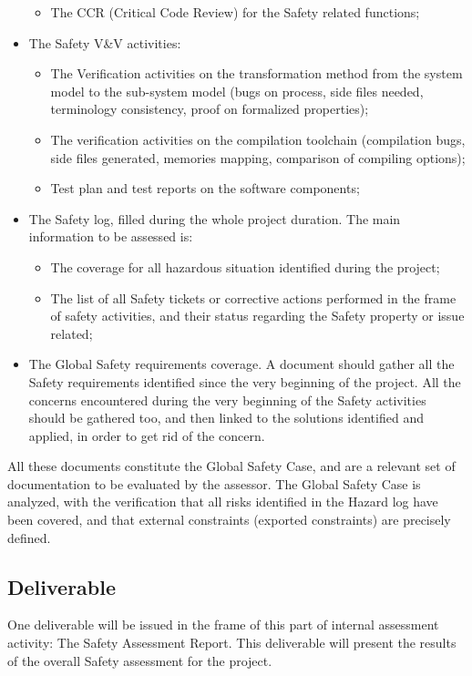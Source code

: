 \documentclass[openetcs]{template/openetcs_article}
\begin{document}
\begin{itemize}
\begin{itemize}
	\item The CCR (Critical Code Review) for the Safety related functions;
	\end{itemize}
\item The Safety V\&V activities:
	\begin{itemize}
\item The Verification activities on the transformation method from the system model to the sub-system model (bugs on process, side files needed, terminology
consistency, proof on formalized properties);
	\item The verification activities on the compilation toolchain (compilation bugs, side files generated, memories mapping, comparison of compiling options);
	\item Test plan and test reports on the software components;
	\end{itemize}
\item The Safety log, filled during the whole project duration. The main information to be assessed is:
	\begin{itemize}
	\item The coverage for all hazardous situation identified during the project;
\item The list of all Safety tickets or corrective actions performed in the frame of safety activities, and their status regarding the Safety property or issue
related;
	\end{itemize}
\item The Global Safety requirements coverage. A document should gather all the Safety requirements identified since the very beginning of the project. All
the concerns encountered during the very beginning of the Safety activities should be gathered too, and then linked to the solutions identified and applied, in
order to get rid of the concern.
\end{itemize}

All these documents constitute the Global Safety Case, and are a relevant set of documentation to be evaluated by the assessor. The Global Safety Case is
analyzed, with the verification that all risks identified in the Hazard log have been covered, and that external constraints (exported constraints) are
precisely defined.


\subsection{Deliverable}
One deliverable will be issued in the frame of this part of internal assessment activity: The Safety Assessment Report. This deliverable will present the
results of the overall Safety assessment for the project.
\end{document}
